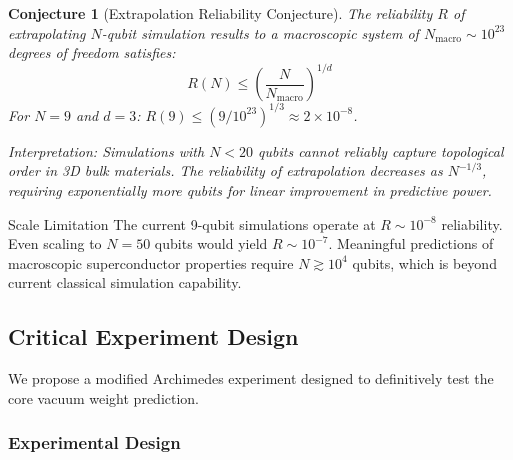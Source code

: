 \documentclass[11pt,a4paper]{article}
\newtheorem{conjecture}{Conjecture}
\begin{document}
\begin{conjecture}[Extrapolation Reliability Conjecture]
The reliability $R$ of extrapolating $N$-qubit simulation results to a macroscopic system of $N_{\text{macro}} \sim 10^{23}$ degrees of freedom satisfies:
\begin{equation}
  R(N) \leq \left(\frac{N}{N_{\text{macro}}}\right)^{1/d}
\end{equation}
For $N = 9$ and $d = 3$: $R(9) \leq (9/10^{23})^{1/3} \approx 2 \times 10^{-8}$.

\textit{Interpretation:} Simulations with $N < 20$ qubits cannot reliably capture topological order in 3D bulk materials. The reliability of extrapolation decreases as $N^{-1/3}$, requiring exponentially more qubits for linear improvement in predictive power.
\end{conjecture}

\begin{critbox}{Scale Limitation}
The current 9-qubit simulations operate at $R \sim 10^{-8}$ reliability. Even scaling to $N = 50$ qubits would yield $R \sim 10^{-7}$. Meaningful predictions of macroscopic superconductor properties require $N \gtrsim 10^4$ qubits, which is beyond current classical simulation capability.
\end{critbox}

\subsection{Critical Experiment Design}

We propose a modified Archimedes experiment designed to definitively test the core vacuum weight prediction.

\subsubsection{Experimental Design}
\end{document}
